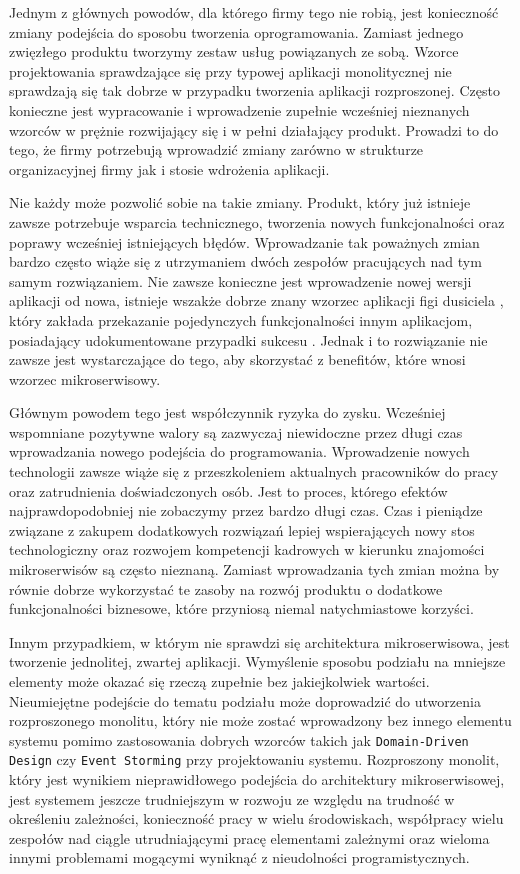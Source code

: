 \documentclass[12pt,twoside]{article}
\begin{document}
Jednym z głównych powodów, dla którego firmy tego nie robią, jest konieczność zmiany podejścia do sposobu tworzenia oprogramowania. Zamiast jednego zwięzłego produktu tworzymy zestaw usług powiązanych ze sobą. Wzorce projektowania sprawdzające się przy typowej aplikacji monolitycznej nie sprawdzają się tak dobrze w przypadku tworzenia aplikacji rozproszonej. Często konieczne jest wypracowanie i wprowadzenie zupełnie wcześniej nieznanych wzorców w prężnie rozwijający się i w pełni działający produkt. Prowadzi to do tego, że firmy potrzebują wprowadzić zmiany zarówno w strukturze organizacyjnej firmy jak i stosie wdrożenia aplikacji.

Nie każdy może pozwolić sobie na takie zmiany. Produkt, który już istnieje zawsze potrzebuje wsparcia technicznego, tworzenia nowych funkcjonalności oraz poprawy wcześniej istniejących błędów. Wprowadzanie tak poważnych zmian bardzo często wiąże się z utrzymaniem dwóch zespołów pracujących nad tym samym rozwiązaniem. Nie zawsze konieczne jest wprowadzenie nowej wersji aplikacji od nowa, istnieje wszakże dobrze znany wzorzec aplikacji figi dusiciela \cite{stranglerFowler}, który zakłada przekazanie pojedynczych funkcjonalności innym aplikacjom, posiadający udokumentowane przypadki sukcesu \cite{strangler}. Jednak i to rozwiązanie nie zawsze jest wystarczające do tego, aby skorzystać z benefitów, które wnosi wzorzec mikroserwisowy.

Głównym powodem tego jest współczynnik ryzyka do zysku. Wcześniej wspomniane pozytywne walory są zazwyczaj niewidoczne przez długi czas wprowadzania nowego podejścia do programowania. Wprowadzenie nowych technologii zawsze wiąże się z przeszkoleniem aktualnych pracowników do pracy oraz zatrudnienia doświadczonych osób. Jest to proces, którego efektów najprawdopodobniej nie zobaczymy przez bardzo długi czas. Czas i pieniądze związane z zakupem dodatkowych rozwiązań lepiej wspierających nowy stos technologiczny oraz rozwojem kompetencji kadrowych w kierunku znajomości mikroserwisów są często nieznaną. Zamiast wprowadzania tych zmian można by równie dobrze wykorzystać te zasoby na rozwój produktu o dodatkowe funkcjonalności biznesowe, które przyniosą niemal natychmiastowe korzyści.

Innym przypadkiem, w którym nie sprawdzi się architektura mikroserwisowa, jest tworzenie jednolitej, zwartej aplikacji. Wymyślenie sposobu podziału na mniejsze elementy może okazać się rzeczą zupełnie bez jakiejkolwiek wartości. Nieumiejętne podejście do tematu podziału może doprowadzić do utworzenia rozproszonego monolitu, który nie może zostać wprowadzony bez innego elementu systemu pomimo zastosowania dobrych wzorców takich jak \texttt{Domain-Driven Design} czy \texttt{Event Storming} przy projektowaniu systemu. Rozproszony monolit, który jest wynikiem nieprawidłowego podejścia do architektury mikroserwisowej, jest systemem jeszcze trudniejszym w rozwoju ze względu na trudność w określeniu zależności, konieczność pracy w wielu środowiskach, współpracy wielu zespołów nad ciągle utrudniającymi pracę elementami zależnymi oraz wieloma innymi problemami mogącymi wyniknąć z nieudolności programistycznych.
\end{document}
